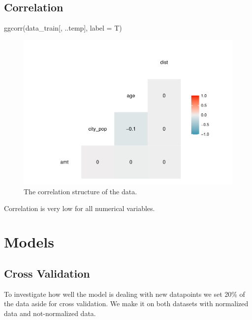 \documentclass[
]{report}
\newenvironment{Shaded}{\begin{snugshade}}{\end{snugshade}}
\newcommand{\AttributeTok}[1]{\textcolor[rgb]{0.77,0.63,0.00}{#1}}
\newcommand{\FunctionTok}[1]{\textcolor[rgb]{0.00,0.00,0.00}{#1}}
\newcommand{\NormalTok}[1]{#1}
\begin{document}
\hypertarget{correlation}{%
\section{Correlation}\label{correlation}}

\begin{Shaded}
\begin{Highlighting}[]
\FunctionTok{ggcorr}\NormalTok{(data\_train[, ..temp], }\AttributeTok{label =}\NormalTok{ T)}
\end{Highlighting}
\end{Shaded}

\begin{figure}
\centering
\includegraphics{credit_card_fraud_detection_files/figure-latex/correlation-1.pdf}
\caption{The correlation structure of the data.}
\end{figure}

Correlation is very low for all numerical variables.

\hypertarget{models}{%
\chapter{Models}\label{models}}

\hypertarget{cross-validation}{%
\section{Cross Validation}\label{cross-validation}}

To investigate how well the model is dealing with new datapoints we set
20\% of the data aside for cross validation. We make it on both datasets
with normalized data and not-normalized data.
\end{document}
